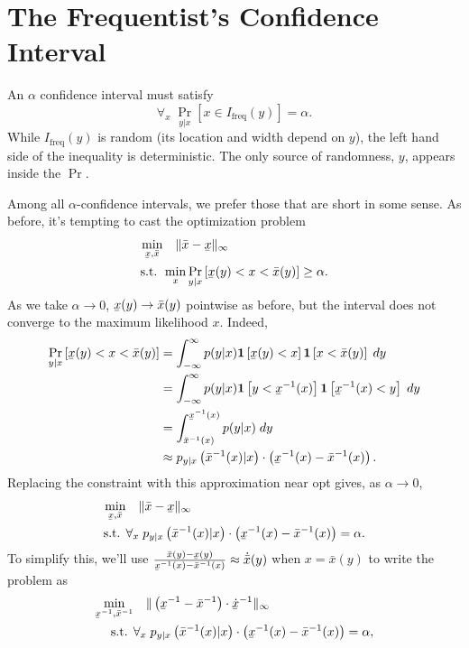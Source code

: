 \documentclass{article}
\newcommand{\Ifreq}{I_\text{freq}}
\newcommand{\xl}{\underaccent{\bar}{x}}
\newcommand{\xh}{\bar{x}}
\newcommand{\1}{\mathbf{1}}
\begin{document}
\section{The Frequentist's Confidence Interval}

An $\alpha$ confidence interval must satisfy
\begin{equation}
\forall_x\; \Pr_{y|x}\left[x \in \Ifreq(y)\right] = \alpha.
\end{equation}
While $\Ifreq(y)$ is random (its location and width depend on $y$), the left
hand side of the inequality is deterministic. The only source of randomness,
$y$, appears inside the $\Pr$. 

Among all $\alpha$-confidence intervals, we prefer those that are short in some
sense. As before, it's tempting to cast the optimization problem
\begin{align}\label{eq:freq-interval}
\min_{\xl, \xh} &\quad  \| \xh - \xl \|_\infty \\
\text{s.t. } & \min_x \Pr_{y|x}\left[\xl(y) < x < \xh(y) \right] \geq \alpha.
\end{align}
As we take $\alpha\to 0$, $\xl(y) \to \xh(y)$ pointwise as before, but the
interval does not converge to the maximum likelihood $x$. Indeed,
\begin{align}
        \Pr_{y|x}\left[\xl(y) < x < \xh(y)\right] &= \int_{-\infty}^\infty p(y|x) \1\left[ \xl(y) < x\right] \1\left[x < \xh(y)\right] \;dy\\
        &= \int_{-\infty}^\infty p(y|x) \1\left[ y < \xl^{-1}(x)\right] \1\left[\xl^{-1}(x) < y\right] \;dy\\
        &= \int_{\xh^{-1}(x)}^{\xl^{-1}(x)} p(y|x)  \;dy\\
        &\approx p_{y|x}\left(\xh^{-1}(x) | x\right) \cdot \left(\xl^{-1}(x)-\xh^{-1}(x)\right).
\end{align}
Replacing the constraint with this approximation near opt gives, as $\alpha\to 0$,
\begin{align}\label{eq:non-mle}
  \min_{\xl, \xh} &\quad  \| \xh - \xl \|_\infty \\
  \text{s.t. } & \forall_x\; p_{y|x}\left(\xh^{-1}(x) | x\right) \cdot \left(\xl^{-1}(x)-\xh^{-1}(x)\right) = \alpha.
\end{align}
To simplify this, we'll use $\frac{\xh(y) - \xl(y)}{\xl^{-1}(x)-\xh^{-1}(x)} \approx \dot{\xh}(y)$ when $x = \xh(y)$ to write the problem as
\begin{align}
\min_{\xl^{-1}, \xh^{-1}} &\quad  \| \left(\xl^{-1} - \xh^{-1} \right) \cdot \dot{\xl}^{-1}\|_\infty \\
\text{s.t. } & \forall_x\; p_{y|x}\left(\xh^{-1}(x) | x\right) \cdot \left(\xl^{-1}(x)-\xh^{-1}(x)\right) = \alpha,
\end{align}
\end{document}
